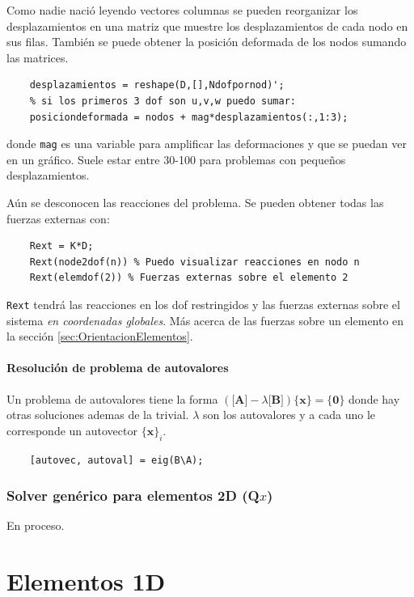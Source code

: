 \documentclass[11pt, a4paper,titlepage]{article}
\newcommand{\Mme}[1]{\boldsymbol{[}\mathbf{#1} \boldsymbol{]}}
\newcommand{\Cme}[1]{\boldsymbol{\{ }\mathbf{#1} \boldsymbol{\}} }
\let\oldpart\part
\renewcommand{\part}[1]{\clearpage \oldpart{#1}}
\begin{document}
Como nadie nació leyendo vectores columnas se pueden reorganizar los desplazamientos en una matriz que muestre los desplazamientos de cada nodo en sus filas. También se puede obtener la posición deformada de los nodos sumando las matrices.
\begin{verbatim}
    desplazamientos = reshape(D,[],Ndofpornod)';
    % si los primeros 3 dof son u,v,w puedo sumar:
    posiciondeformada = nodos + mag*desplazamientos(:,1:3); 
\end{verbatim}
 donde \texttt{mag} es una variable para amplificar las deformaciones y que se puedan ver en un gráfico. Suele estar entre 30-100 para problemas con pequeños desplazamientos.

Aún se desconocen las reacciones del problema. Se pueden obtener todas las fuerzas externas con:
\begin{verbatim}
    Rext = K*D;
    Rext(node2dof(n)) % Puedo visualizar reacciones en nodo n
    Rext(elemdof(2)) % Fuerzas externas sobre el elemento 2
\end{verbatim}
\texttt{Rext} tendrá las reacciones en los dof restringidos y las fuerzas externas sobre el sistema \textit{en coordenadas globales}. Más acerca de las fuerzas sobre un elemento en la sección \ref{sec:OrientacionElementos}.

\subsection*{Resolución de problema de autovalores}
Un problema de autovalores tiene la forma $\left(\Mme{A} - \lambda \Mme{B} \right) \Cme{x} = \Cme{0}$ donde hay otras soluciones ademas de la trivial. $\lambda$ son los autovalores y a cada uno le corresponde un autovector $\Cme{x}_i$.

\begin{verbatim}
	[autovec, autoval] = eig(B\A);
\end{verbatim}

\section{Solver genérico para elementos 2D (Q$x$)}
En proceso.
\part{Elementos 1D}
\end{document}

